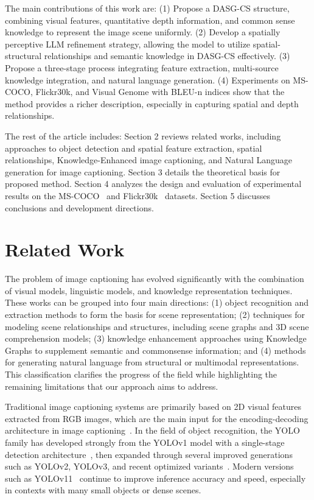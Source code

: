 \documentclass[runningheads,14pt]{llncs}
\begin{document}
The main contributions of this work are: 
(1)	Propose a DASG-CS structure, combining visual features, quantitative depth information, and common sense knowledge to represent the image scene uniformly.
(2)	Develop a spatially perceptive LLM refinement strategy, allowing the model to utilize spatial-structural relationships and semantic knowledge in DASG-CS effectively.
(3)	Propose a three-stage process integrating feature extraction, multi-source knowledge integration, and natural language generation.
(4)	Experiments on MS-COCO, Flickr30k, and Visual Genome with BLEU-n indices show that the method provides a richer description, especially in capturing spatial and depth relationships.

The rest of the article includes: Section 2 reviews related works, including approaches to object detection and spatial feature extraction, spatial relationships, Knowledge-Enhanced image captioning, and Natural Language generation for image captioning. Section 3 details the theoretical basis for proposed method. Section 4 analyzes the design and evaluation of experimental results on the MS-COCO~\cite{coco} and Flickr30k~\cite{flickr30k} datasets. Section 5 discusses conclusions and development directions.


\section{Related Work}

The problem of image captioning has evolved significantly with the combination of visual models, linguistic models, and knowledge representation techniques. These works can be grouped into four main directions: (1) object recognition and extraction methods to form the basis for scene representation; (2) techniques for modeling scene relationships and structures, including scene graphs and 3D scene comprehension models; (3) knowledge enhancement approaches using Knowledge Graphs to supplement semantic and commonsense information; and (4) methods for generating natural language from structural or multimodal representations. This classification clarifies the progress of the field while highlighting the remaining limitations that our approach aims to address.

Traditional image captioning systems are primarily based on 2D visual features extracted from RGB images, which are the main input for the encoding-decoding architecture in image captioning~\cite{vinyals2015show,xu2015show}. In the field of object recognition, the YOLO family has developed strongly from the YOLOv1 model with a single-stage detection architecture~\cite{redmon2016you}, then expanded through several improved generations such as YOLOv2, YOLOv3, and recent optimized variants~\cite{bochkovskiy2020yolov4,ultralytics2023yolov8}. Modern versions such as YOLOv11~\cite{ultralytics2024yolov11} continue to improve inference accuracy and speed, especially in contexts with many small objects or dense scenes.
\end{document}
